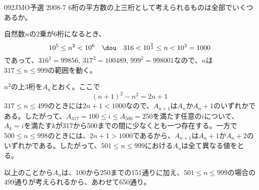 \begin{thm}{092}{}{JMO予選 2008-7}
 6桁の平方数の上三桁として考えられるものは全部でいくつあるか。 \hfil
\end{thm}

自然数$n$の2乗が6桁になるとき、
\[ 10^5\le n^2 < 10^6 \quad \dou\quad 316<10^{\frac{5}{2}}\le n < 10^3=1000 \]
であって、$316^2=99856$, $317^2=100489$, $999^2=998001$なので、$n$は$317\le n\le 999$の範囲を動く。

$n^2$の上3桁を$A_n$とおく。ここで
\[ (n+1)^2-n^2=2n+1 \]
$317\le n\le 499$のときには$2n+1<1000$なので、$A_{n+1}$は$A_n$か$A_n+1$のいずれかである。したがって、$A_{317}=100\le i\le A_{500}=250$を満たす任意の$i$について、$A_k=i$を満たす$k$が317から500までの間に少なくとも一つ存在する。一方で$500\le n\le 998$のときには、$2n+1>1000$であるから、$A_{n+1}$は$A_n+1$か$A_n+2$のいずれかである。したがって、$501\le n \le 999$における$A_n$は全て異なる値をとる。

以上のことから$A_n$は、100から250までの151通りに加え、$501\le n\le 999$の場合の499通りが考えられるから、あわせて650通り。